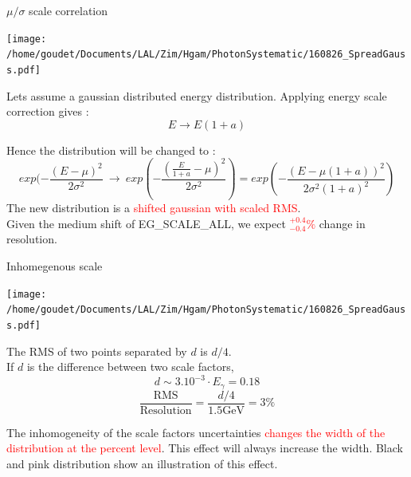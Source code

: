 \begin{frame}{$\mu /\sigma$ scale correlation}
  \begin{minipage}{0.49\linewidth}\texttt{[image: /home/goudet/Documents/LAL/Zim/Hgam/PhotonSystematic/160826\_SpreadGauss.pdf]}\end{minipage}
  \hfill
  \begin{minipage}{0.49\linewidth}
    Lets assume a gaussian distributed energy distribution.
    Applying energy scale correction gives : $$E\rightarrow E(1+a)$$

  \end{minipage}
      Hence the distribution will be changed to  :
      \begin{equation}
      exp( -\frac{(E-\mu)^2}{2\sigma^2}\
      \rightarrow\
      exp( -\frac{(\frac{E}{1+a}-\mu)^2}{2\sigma^2})
      =
      exp( -\frac{(E-\mu(1+a))^2}{2\sigma^2(1+a)^2})
    \end{equation}
      The new distribution is a \textcolor{red}{shifted gaussian with scaled RMS}.\\
      Given the medium shift of EG\_SCALE\_ALL, we expect \textcolor{red}{$^{+0.4}_{-0.4}\%$} change in resolution.
\end{frame}


\begin{frame}{Inhomegenous scale}
  \begin{minipage}{0.49\linewidth}\texttt{[image: /home/goudet/Documents/LAL/Zim/Hgam/PhotonSystematic/160826\_SpreadGauss.pdf]}\end{minipage}
  \hfill
  \begin{minipage}{0.49\linewidth}
    The RMS of two points separated by $d$ is $d/4$.\\
    If $d$ is the difference between two scale factors, $$d\sim 3.10^{-3} \cdot E_\gamma=0.18$$
   $$\frac{\text{RMS}}{\text{Resolution}} = \frac{d/4}{1.5\text{GeV}} = 3\%$$
  \end{minipage}
\vfill
  The inhomogeneity of the scale factors uncertainties \textcolor{red}{changes the width of the distribution at the percent level}.
  This effect will always increase the width.  
  \vfill
  Black and pink distribution show an illustration of this effect.
\end{frame}


